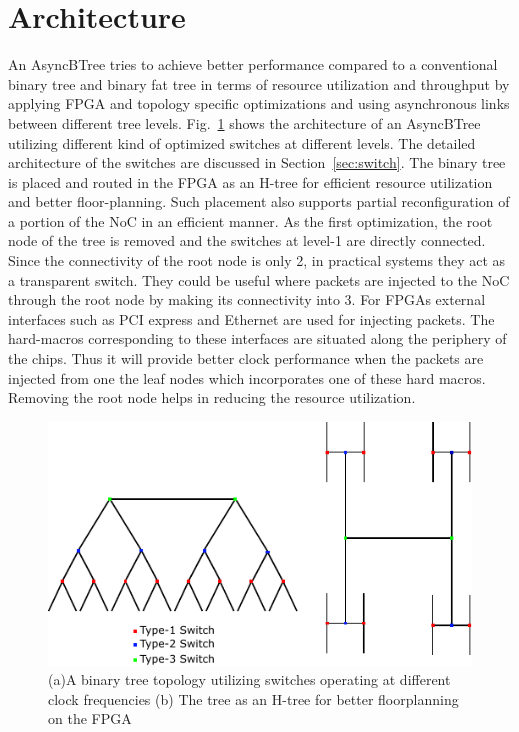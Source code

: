 \section{Architecture}
\label{sec:arch}

An AsyncBTree tries to achieve better performance compared to a conventional binary tree and binary fat tree in terms of resource utilization and throughput by applying FPGA and topology specific optimizations and using asynchronous links between different tree levels.
Fig.~\ref{fig:btree} shows the architecture of an AsyncBTree utilizing different kind of optimized switches at different levels.
The detailed architecture of the switches are discussed in Section~\ref{sec:switch}.
The binary tree is placed and routed in the FPGA as an H-tree for efficient resource utilization and better floor-planning.
Such placement also supports partial reconfiguration of a portion of the NoC in an efficient manner.
As the first optimization, the root node of the tree is removed and the switches at level-1 are directly connected.
Since the connectivity of the root node is only 2, in practical systems they act as a transparent switch.
They could be useful where packets are injected to the NoC through the root node by making its connectivity into 3.
For FPGAs external interfaces such as PCI express and Ethernet are used for injecting packets.
The hard-macros corresponding to these interfaces are situated along the periphery of the chips.
Thus it will provide better clock performance when the packets are injected from one the leaf nodes which incorporates one of these hard macros.
Removing the root node helps in reducing the resource utilization.

\begin{figure}[t]
\centering
   \includegraphics[width=\columnwidth]{Figures/HNoC.pdf}
   \caption{(a)A binary tree topology utilizing switches operating at different clock frequencies (b) The tree as an H-tree for better floorplanning on the FPGA}
   \label{fig:btree}
\end{figure}


